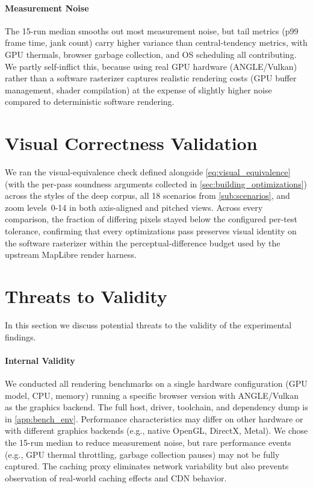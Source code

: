 \paragraph{Measurement Noise}
The 15-run median smooths out most measurement noise, but tail metrics (p99 frame time, jank count) carry higher variance than central-tendency metrics, with \ac{GPU} thermals, browser garbage collection, and OS scheduling all contributing.
We partly self-inflict this, because using real \ac{GPU} hardware (ANGLE/Vulkan) rather than a software rasterizer captures realistic rendering costs (\ac{GPU} buffer management, shader compilation) at the expense of slightly higher noise compared to deterministic software rendering.

\section{Visual Correctness Validation}\label{sec:visual_correctness}

We ran the visual-equivalence check defined alongside \cref{eq:visual_equivalence} (with the per-pass soundness arguments collected in \cref{sec:building_optimizations}) across the styles of the deep corpus, all 18 scenarios from \cref{sub:scenarios}, and zoom levels~0-14 in both axis-aligned and pitched views.
Across every comparison, the fraction of differing pixels stayed below the configured per-test tolerance, confirming that every optimizations pass preserves visual identity on the software rasterizer within the perceptual-difference budget used by the upstream MapLibre render harness.

\section{Threats to Validity}\label{sec:threats}

In this section we discuss potential threats to the validity of the experimental findings.

\paragraph{Internal Validity}
We conducted all rendering benchmarks on a single hardware configuration (\ac{GPU} model, \ac{CPU}, memory) running a specific browser version with ANGLE/Vulkan as the graphics backend.
The full host, driver, toolchain, and dependency dump is in \cref{app:bench_env}.
Performance characteristics may differ on other hardware or with different graphics backends (e.g., native OpenGL, DirectX, Metal).
We chose the 15-run median to reduce measurement noise, but rare performance events (e.g., \ac{GPU} thermal throttling, garbage collection pauses) may not be fully captured.
The caching proxy eliminates network variability but also prevents observation of real-world caching effects and \ac{CDN} behavior.

